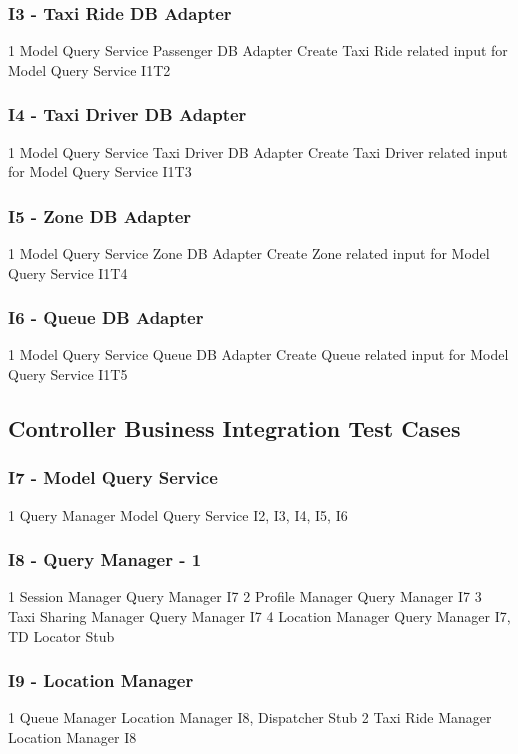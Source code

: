 \subsubsection{I3 - Taxi Ride DB Adapter}
\testCaseStdOut
	{1}
	{Model Query Service}
	{Passenger DB Adapter}
	{Create Taxi Ride related input for Model Query Service}
	{I1T2}
\subsubsection{I4 - Taxi Driver DB Adapter}
\testCaseStdOut
	{1}
	{Model Query Service}
	{Taxi Driver DB Adapter}
	{Create Taxi Driver related input for Model Query Service}
	{I1T3}
\subsubsection{I5 - Zone DB Adapter}
\testCaseStdOut
	{1}
	{Model Query Service}
	{Zone DB Adapter}
	{Create Zone related input for Model Query Service}
	{I1T4}
\subsubsection{I6 - Queue DB Adapter}
\testCaseStdOut
	{1}
	{Model Query Service}
	{Queue DB Adapter}
	{Create Queue related input for Model Query Service}
	{I1T5}
\subsection{Controller Business Integration Test Cases}
\subsubsection{I7 - Model Query Service}
\testCaseStdInOut
	{1}
	{Query Manager}
	{Model Query Service}
	{I2, I3, I4, I5, I6}
\subsubsection{I8 - Query Manager - 1}
\testCaseStdInOut
	{1}
	{Session Manager}
	{Query Manager}
	{I7}
\testCaseStdInOut
	{2}
	{Profile Manager}
	{Query Manager}
	{I7}
\testCaseStdInOut
	{3}
	{Taxi Sharing Manager}
	{Query Manager}
	{I7}
\testCaseStdInOut
	{4}
	{Location Manager}
	{Query Manager}
	{I7, TD Locator Stub}
\subsubsection{I9 - Location Manager}
\testCaseStdInOut
	{1}
	{Queue Manager}
	{Location Manager}
	{I8, Dispatcher Stub}
\testCaseStdInOut
	{2}
	{Taxi Ride Manager}
	{Location Manager}
	{I8}
